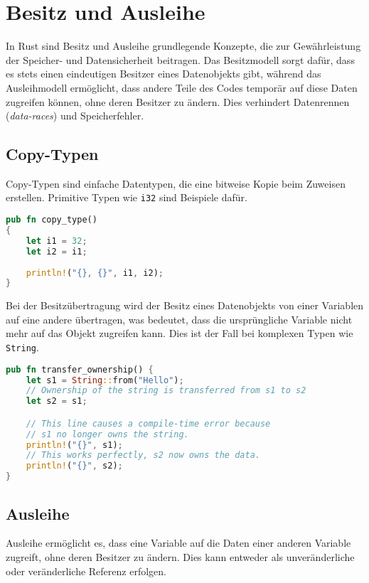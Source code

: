 \chapter{Besitz und Ausleihe}

In Rust sind Besitz und Ausleihe grundlegende Konzepte, die zur Gewährleistung der Speicher- und Datensicherheit beitragen. 
Das Besitzmodell sorgt dafür, dass es stets einen eindeutigen Besitzer eines Datenobjekts gibt, während das Ausleihmodell ermöglicht, dass andere Teile des Codes temporär auf diese Daten zugreifen können, ohne deren Besitzer zu ändern. 
Dies verhindert Datenrennen (\textit{\glspl{data-race}}) und Speicherfehler.

\section{Copy-Typen}
Copy-Typen sind einfache Datentypen, die eine bitweise Kopie beim Zuweisen erstellen. Primitive Typen wie \texttt{i32} sind Beispiele dafür.

\begin{lstlisting}[language=Rust, caption=Copy-Typen]
pub fn copy_type() 
{
    let i1 = 32;
    let i2 = i1;
    
    println!("{}, {}", i1, i2);
}
\end{lstlisting}
\noindent
Bei der Besitzübertragung wird der Besitz eines Datenobjekts von einer Variablen auf eine andere übertragen, was bedeutet, dass die ursprüngliche Variable nicht mehr auf das Objekt zugreifen kann.
Dies ist der Fall bei komplexen Typen wie \texttt{String}.

\begin{lstlisting}[language=Rust, caption=Unveränderliche Ausleihe]
pub fn transfer_ownership() {
    let s1 = String::from("Hello");
    // Ownership of the string is transferred from s1 to s2
    let s2 = s1;  

    // This line causes a compile-time error because 
    // s1 no longer owns the string.
    println!("{}", s1); 
    // This works perfectly, s2 now owns the data.
    println!("{}", s2); 
}
\end{lstlisting}
\cleardoublepage
\section{Ausleihe}
Ausleihe ermöglicht es, dass eine Variable auf die Daten einer anderen Variable zugreift, ohne deren Besitzer zu ändern. Dies kann entweder als unveränderliche oder veränderliche Referenz erfolgen.

